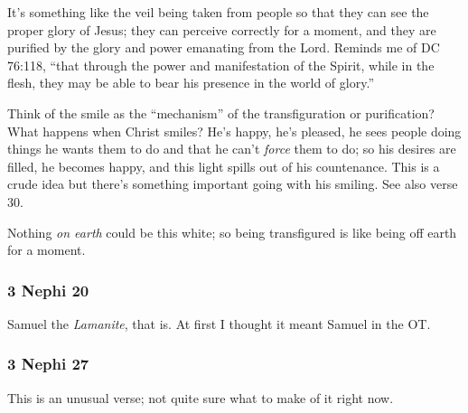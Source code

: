		\begin{compactdesc}
		
		\item[25$\vert$]
		\begin{compactdesc}
		\item[transfiguration] It's something like the veil being taken from people so that they can see the proper glory of Jesus; they can perceive correctly for a moment, and they are purified by the glory and power emanating from the Lord. Reminds me of DC 76:118, ``that through the power and manifestation of the Spirit, while in the flesh, they may be able to bear his presence in the world of glory.''
		\item[countenance did smile upon them] Think of the smile as the ``mechanism'' of the transfiguration or purification? What happens when Christ smiles? He's happy, he's pleased, he sees people doing things he wants them to do and that he can't \textit{force} them to do; so his desires are filled, he becomes happy, and this light spills out of his countenance. This is a crude idea but there's something important going with his smiling. See also verse 30.
		\item[upon earth] Nothing \textit{on earth} could be this white; so being transfigured is like being off earth for a moment.
		\end{compactdesc}
		
		\end{compactdesc}
		
	\subsubsection{3 Nephi 20} %
	
		\begin{compactdesc}
	
		\item[24$\vert$]
		\begin{compactdesc}
		\item[Samuel] Samuel the \textit{Lamanite}, that is. At first I thought it meant Samuel in the OT.
		\end{compactdesc}
		
		\end{compactdesc}
		
	\subsubsection{3 Nephi 27} %
	
		\begin{compactdesc}
		
		\item[24$\vert$]
		\begin{compactdesc}
		\item[...of that which hath been] This is an unusual verse; not quite sure what to make of it right now.
		\end{compactdesc}
		
		\end{compactdesc}
		
